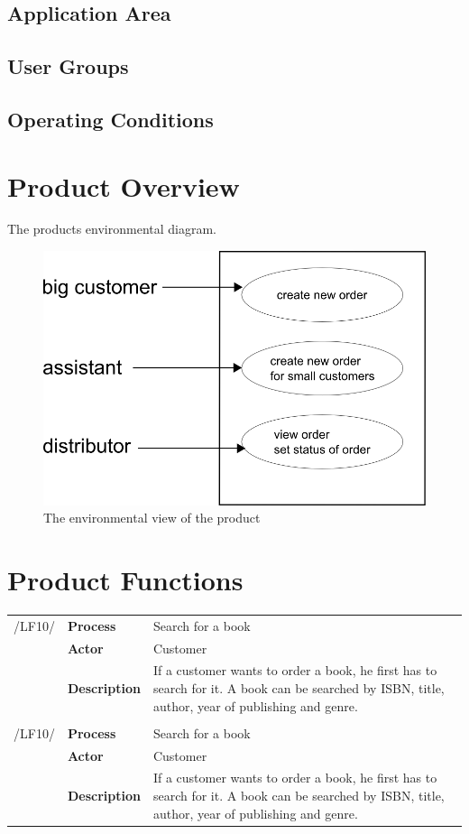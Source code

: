 \documentclass[11pt,a4paper,oneside,svgnames,draft]{report}
\begin{document}
\section{Application Area}
\section{User Groups}
\section{Operating Conditions}

\chapter{Product Overview}
The products environmental diagram.

\begin{figure}[h!]
 \begin{center}
  \includegraphics[scale=0.8]{images/umweltdiagramm.png}
 \end{center}
 \caption{The environmental view of the product}
\end{figure}


\chapter{Product Functions}
\begin{tabular}{llp{10cm}}
/LF10/ & \textbf{Process} & Search for a book\\
& \textbf{Actor} & Customer\\
& \textbf{Description} & If a customer wants to order a book, he first has to search for it. A book can be searched by ISBN, title, author, year of publishing and genre.\\

\hfill \\

/LF10/ & \textbf{Process} & Search for a book\\
& \textbf{Actor} & Customer\\
& \textbf{Description} & If a customer wants to order a book, he first has to search for it. A book can be searched by ISBN, title, author, year of publishing and genre.\\
\end{tabular} 
\end{document}
